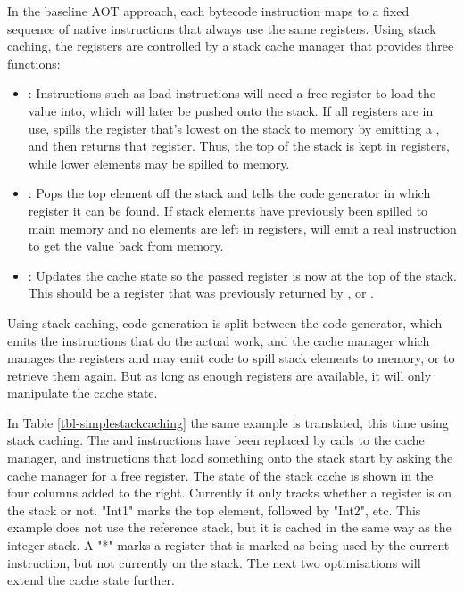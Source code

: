 In the baseline AOT approach, each bytecode instruction maps to a fixed sequence of native instructions that always use the same registers. Using stack caching, the registers are controlled by a stack cache manager that provides three functions:
\begin{itemize}
    \item {}: Instructions such as load instructions will need a free register to load the value into, which will later be pushed onto the stack. If all registers are in use,  spills the register that's lowest on the stack to memory by emitting a , and then returns that register. Thus, the top of the stack is kept in registers, while lower elements may be spilled to memory.
    \item {}: Pops the top element off the stack and tells the code generator in which register it can be found. If stack elements have previously been spilled to main memory and no  elements are left in registers,  will emit a real  instruction to get the value back from memory.
    \item {}: Updates the cache state so the passed register is now at the top of the stack. This should be a register that was previously returned by , or .
\end{itemize}

Using stack caching, code generation is split between the code generator, which emits the instructions that do the actual work, and the cache manager which manages the registers and may emit code to spill stack elements to memory, or to retrieve them again. But as long as enough registers are available, it will only manipulate the cache state.

In Table \ref{tbl-simplestackcaching} the same example is translated, this time using stack caching. The  and  instructions have been replaced by calls to the cache manager, and instructions that load something onto the stack start by asking the cache manager for a free register. The state of the stack cache is shown in the four columns added to the right. Currently it only tracks whether a register is on the stack or not. "Int1" marks the top element, followed by "Int2", etc. This example does not use the reference stack, but it is cached in the same way as the integer stack. A "*" marks a register that is marked as being used by the current instruction, but not currently on the stack. The next two optimisations will extend the cache state further.
 
